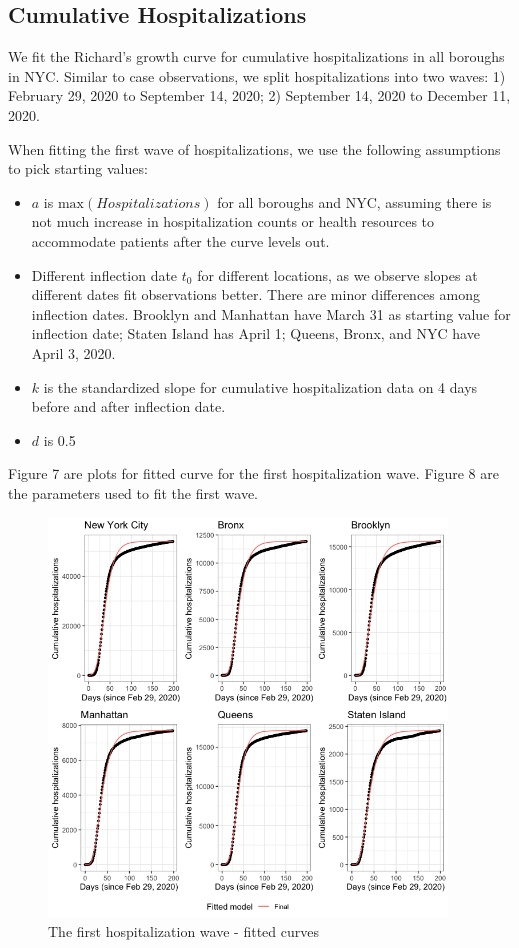 \documentclass[
]{article}
\providecommand{\tightlist}{%
  \setlength{\itemsep}{0pt}\setlength{\parskip}{0pt}}
\begin{document}
\hypertarget{cumulative-hospitalizations}{%
\subsection{Cumulative
Hospitalizations}\label{cumulative-hospitalizations}}

We fit the Richard's growth curve for cumulative hospitalizations in all
boroughs in NYC. Similar to case observations, we split hospitalizations
into two waves: 1) February 29, 2020 to September 14, 2020; 2) September
14, 2020 to December 11, 2020.

When fitting the first wave of hospitalizations, we use the following
assumptions to pick starting values:

\begin{itemize}
\tightlist
\item
  \(a\) is \(\mbox{max}(Hospitalizations)\) for all boroughs and NYC,
  assuming there is not much increase in hospitalization counts or
  health resources to accommodate patients after the curve levels out.
\item
  Different inflection date \(t_0\) for different locations, as we
  observe slopes at different dates fit observations better. There are
  minor differences among inflection dates. Brooklyn and Manhattan have
  March 31 as starting value for inflection date; Staten Island has
  April 1; Queens, Bronx, and NYC have April 3, 2020.
\item
  \(k\) is the standardized slope for cumulative hospitalization data on
  4 days before and after inflection date.
\item
  \(d\) is 0.5
\end{itemize}

Figure 7 are plots for fitted curve for the first hospitalization wave.
Figure 8 are the parameters used to fit the first wave.

\begin{figure}
\centering
\includegraphics[width=4.16667in,height=\textheight]{plots/hosp_plots/no_start_curve/hosp_wave1_all.png}
\caption{The first hospitalization wave - fitted curves}
\end{figure}
\end{document}

